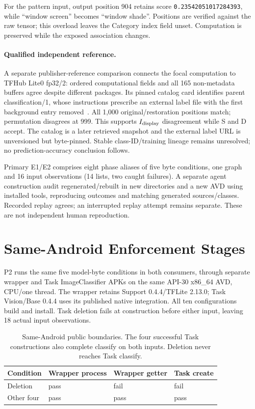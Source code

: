 \documentclass[10pt,conference]{IEEEtran}
\newcommand{\code}[1]{\texttt{#1}}
\begin{document}
For the pattern input, output position 904 retains score \code{0.23542051017284393}, while ``window screen'' becomes ``window shade''. Positions are verified against the raw tensor; this overload leaves the Category index field unset. Computation is preserved while the exposed association changes.

\paragraph{Qualified independent reference.}
\label{sec:p3}
A separate publisher-reference comparison connects the focal computation to TFHub Lite0 fp32/2: ordered computational fields and all 165 non-metadata buffers agree despite different packages. Its pinned catalog card identifies parent classification/1, whose instructions prescribe an external label file with the first background entry removed~\cite{tfhub-lite-card,tfhub-parent-card,imagenet-display}. All 1,000 original/restoration positions match; permutation disagrees at 999. This supports $I_{\rm display}$ disagreement while S and D accept. The catalog is a later retrieved snapshot and the external label URL is unversioned but byte-pinned. Stable class-ID/training lineage remains unresolved; no prediction-accuracy conclusion follows.

Primary E1/E2 comprises eight phase aliases of five byte conditions, one graph and 16 input observations (14 lists, two caught failures). A separate agent construction audit regenerated/rebuilt in new directories and a new AVD using installed tools, reproducing outcomes and matching generated sources/classes. Recorded replay agrees; an interrupted replay attempt remains separate. These are not independent human reproduction.

\section{Same-Android Enforcement Stages}
\label{sec:consumers}
P2 runs the same five model-byte conditions in both consumers, through separate wrapper and Task ImageClassifier APKs on the same API-30 x86\_64 AVD, CPU/one thread. The wrapper retains Support 0.4.4/TFLite 2.13.0; Task Vision/Base 0.4.4 uses its published native integration. All ten configurations build and install. Task deletion fails at construction before either input, leaving 18 actual input observations.

\begin{table}[t]
\caption{Same-Android public boundaries. The four successful Task constructions also complete classify on both inputs. Deletion never reaches Task classify.}
\label{tab:stages}
\centering\footnotesize
\begin{tabular}{@{}llll@{}}
\toprule
Condition & Wrapper process & Wrapper getter & Task create\\
\midrule
Deletion & pass & fail & fail\\
Other four & pass & pass & pass\\
\bottomrule
\end{tabular}
\end{table}
\end{document}
